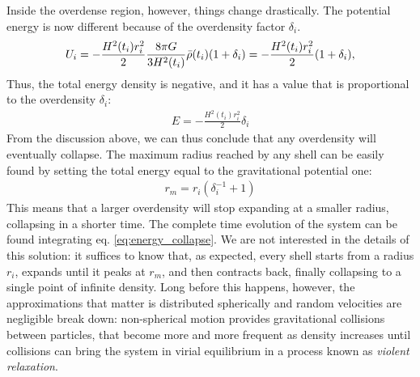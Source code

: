   Inside the overdense region, however, things change drastically. The potential energy is now different because of the overdensity factor $\delta_i$.
  \begin{align}
   U_i = -\frac{H^2(t_i)r_i^2}{2}\frac{8\pi G}{3H^2(t_i)}\Bar{\rho}(t_i)(1+\delta_i) = - \frac{H^2(t_i) r_i^2}{2}(1+\delta_i),
  \end{align}
  Thus, the total energy density is negative, and it has a value that is proportional to the overdensity $\delta_i$:
  \begin{align}
  E = -\frac{H^2(t_i) r_i^2}{2}\delta_i
  \end{align}
  From the discussion above, we can thus conclude that any overdensity will eventually collapse. The maximum radius reached by any shell can be easily found by setting the total energy equal to the gravitational potential one:
  \begin{align}
   r_m = r_i (\delta_i^{-1} + 1)
  \end{align}
  This means that a larger overdensity will stop expanding at a smaller radius, collapsing in a shorter time. The complete time evolution of the system can be found integrating eq. \ref{eq:energy_collapse}. We are not interested in the details of this solution: it suffices to know that, as expected, every shell starts from a radius $r_i$, expands until it peaks at $r_m$, and then contracts back, finally collapsing to a single point of infinite density. Long before this happens, however, the approximations that matter is distributed spherically and random velocities are negligible break down: non-spherical motion provides gravitational collisions between particles, that become more and more frequent as density increases until collisions can bring the system in virial equilibrium in a process known as \textit{violent relaxation}.
  
